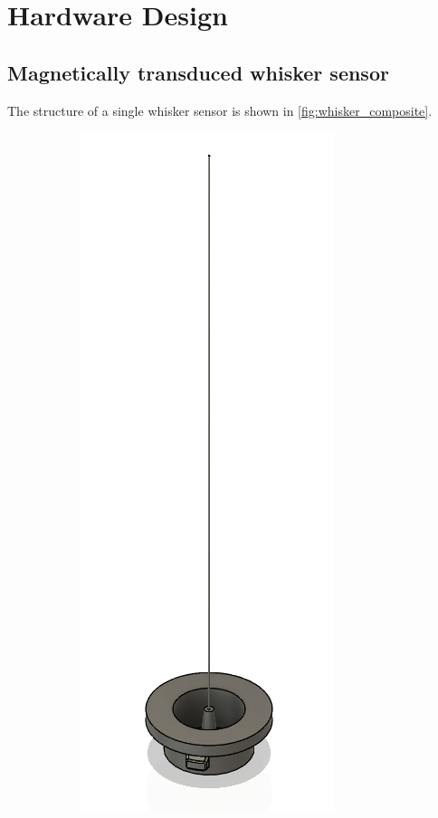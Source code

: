 

\chapter{Hardware Design}


\section{Magnetically transduced whisker sensor}
The structure of a single whisker sensor is shown in \cref{fig:whisker_composite}.

\begin{figure}[ht]
    \centering
    \begin{subfigure}{0.31\textwidth}
        \centering
        \includegraphics[height=0.2\textheight]{figures/whisker}

\end{subfigure}
\end{figure}
